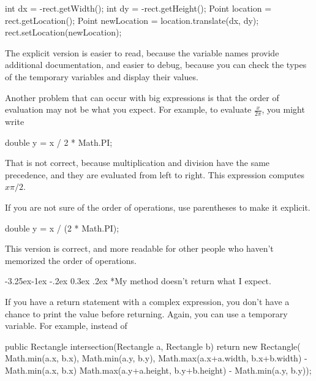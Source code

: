 \documentclass[12pt]{book}
\makeatletter
\theoremstyle{exercise}
\renewcommand\subsection{\@startsection{subsection}{2}{\z@}%
    {-3.25ex\@plus -1ex \@minus -.2ex}%
    {0.3ex \@plus .2ex}%
    {\normalfont\large\bfseries}}
\makeatother
\begin{document}
\begin{code}
int dx = -rect.getWidth();
int dy = -rect.getHeight();
Point location = rect.getLocation();
Point newLocation = location.translate(dx, dy);
rect.setLocation(newLocation);
\end{code}

The explicit version is easier to read, because the variable names provide additional documentation, and easier to debug, because you can check the types of the temporary variables and display their values.


Another problem that can occur with big expressions is that the order of evaluation may not be what you expect.
For example, to evaluate $\frac{x}{2 \pi}$, you might write

\begin{code}
double y = x / 2 * Math.PI;
\end{code}

That is not correct, because multiplication and division have the same precedence, and they are evaluated from left to right.
This expression computes $x \pi / 2$.

If you are not sure of the order of operations, use parentheses to make it explicit.

\begin{code}
double y = x / (2 * Math.PI);
\end{code}

This version is correct, and more readable for other people who haven't memorized the order of operations.



\subsection*{My method doesn't return what I expect.}

If you have a return statement with a complex expression, you don't have a chance to print the value before returning.
Again, you can use a temporary variable.  For example, instead of

\begin{code}
public Rectangle intersection(Rectangle a, Rectangle b) {
    return new Rectangle(
        Math.min(a.x, b.x),
        Math.min(a.y, b.y),
        Math.max(a.x+a.width, b.x+b.width) - Math.min(a.x, b.x)
        Math.max(a.y+a.height, b.y+b.height) - Math.min(a.y, b.y));
}
\end{code}
\end{document}
